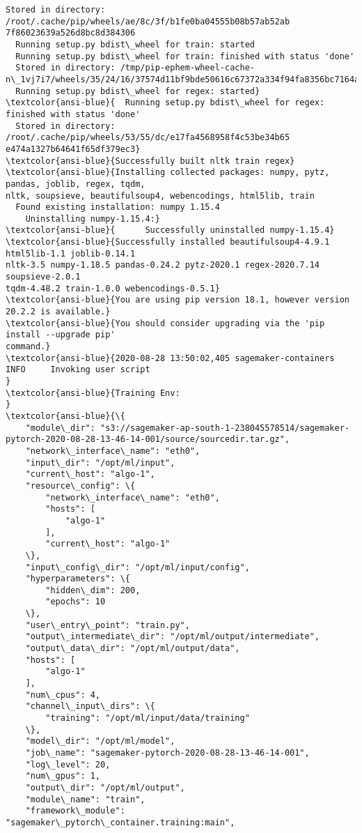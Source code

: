 \documentclass[11pt]{article}
\begin{document}
\begin{Verbatim}[commandchars=\\\{\}]
  Stored in directory: /root/.cache/pip/wheels/ae/8c/3f/b1fe0ba04555b08b57ab52ab
7f86023639a526d8bc8d384306
  Running setup.py bdist\_wheel for train: started
  Running setup.py bdist\_wheel for train: finished with status 'done'
  Stored in directory: /tmp/pip-ephem-wheel-cache-
n\_1vj7i7/wheels/35/24/16/37574d11bf9bde50616c67372a334f94fa8356bc7164af8ca3
  Running setup.py bdist\_wheel for regex: started}
\textcolor{ansi-blue}{  Running setup.py bdist\_wheel for regex: finished with status 'done'
  Stored in directory: /root/.cache/pip/wheels/53/55/dc/e17fa4568958f4c53be34b65
e474a1327b64641f65df379ec3}
\textcolor{ansi-blue}{Successfully built nltk train regex}
\textcolor{ansi-blue}{Installing collected packages: numpy, pytz, pandas, joblib, regex, tqdm,
nltk, soupsieve, beautifulsoup4, webencodings, html5lib, train
  Found existing installation: numpy 1.15.4
    Uninstalling numpy-1.15.4:}
\textcolor{ansi-blue}{      Successfully uninstalled numpy-1.15.4}
\textcolor{ansi-blue}{Successfully installed beautifulsoup4-4.9.1 html5lib-1.1 joblib-0.14.1
nltk-3.5 numpy-1.18.5 pandas-0.24.2 pytz-2020.1 regex-2020.7.14 soupsieve-2.0.1
tqdm-4.48.2 train-1.0.0 webencodings-0.5.1}
\textcolor{ansi-blue}{You are using pip version 18.1, however version 20.2.2 is available.}
\textcolor{ansi-blue}{You should consider upgrading via the 'pip install --upgrade pip'
command.}
\textcolor{ansi-blue}{2020-08-28 13:50:02,405 sagemaker-containers INFO     Invoking user script
}
\textcolor{ansi-blue}{Training Env:
}
\textcolor{ansi-blue}{\{
    "module\_dir": "s3://sagemaker-ap-south-1-238045578514/sagemaker-
pytorch-2020-08-28-13-46-14-001/source/sourcedir.tar.gz",
    "network\_interface\_name": "eth0",
    "input\_dir": "/opt/ml/input",
    "current\_host": "algo-1",
    "resource\_config": \{
        "network\_interface\_name": "eth0",
        "hosts": [
            "algo-1"
        ],
        "current\_host": "algo-1"
    \},
    "input\_config\_dir": "/opt/ml/input/config",
    "hyperparameters": \{
        "hidden\_dim": 200,
        "epochs": 10
    \},
    "user\_entry\_point": "train.py",
    "output\_intermediate\_dir": "/opt/ml/output/intermediate",
    "output\_data\_dir": "/opt/ml/output/data",
    "hosts": [
        "algo-1"
    ],
    "num\_cpus": 4,
    "channel\_input\_dirs": \{
        "training": "/opt/ml/input/data/training"
    \},
    "model\_dir": "/opt/ml/model",
    "job\_name": "sagemaker-pytorch-2020-08-28-13-46-14-001",
    "log\_level": 20,
    "num\_gpus": 1,
    "output\_dir": "/opt/ml/output",
    "module\_name": "train",
    "framework\_module": "sagemaker\_pytorch\_container.training:main",

\end{Verbatim}
\end{document}
